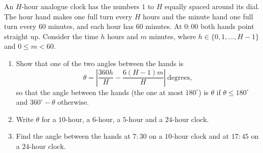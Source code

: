 An $H$-hour analogue clock has the numbers $1$ to $H$ equally spaced around its dial. The hour hand makes one full turn every $H$ hours and the minute hand one full turn every $60$ minutes, and each hour has $60$ minutes. At $0{:}00$ both hands point straight up. Consider the time $h$ hours and $m$ minutes, where $h\in\{0,1,\dots,H-1\}$ and $0\le m<60$.
\begin{enumerate}
\item[(a)] Show that one of the two angles between the hands is
\[\theta=\left|\dfrac{360h}{H}-\dfrac{6(H-1)m}{H}\right|\ \text{degrees},\]
so that the angle between the hands (the one at most $180^\circ$) is $\theta$ if $\theta\le180^\circ$ and $360^\circ-\theta$ otherwise.
\item[(b)] Write $\theta$ for a $10$-hour, a $6$-hour, a $5$-hour and a $24$-hour clock.
\item[(c)] Find the angle between the hands at $7{:}30$ on a $10$-hour clock and at $17{:}45$ on a $24$-hour clock.
\end{enumerate}
